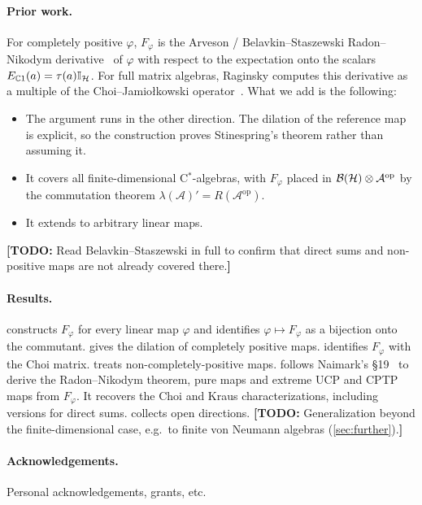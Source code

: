 \documentclass[12pt]{article}
\newcommand{\todo}[1]{\textcolor{\mysubcolor}{\small\textbf{[TODO:} #1\textbf{]}}}
\newcommand{\alg}{\mathcal{A}}             %
\newcommand{\hilb}{\mathcal{H}}            %
\newcommand{\bdd}[1]{\mathcal{B}\br{#1}}   %
\newcommand{\op}{^{\mathrm{op}}}           %
\newcommand{\Fphi}{F_{\varphi}}
\newcommand{\Esc}{E_{\complex 1}}          %
\begin{document}
\paragraph{Prior work.}
For completely positive \(\varphi\), \(\Fphi\) is the Arveson /
Belavkin--Staszewski Radon--Nikodym derivative~\cite{Arveson1969,
BelavkinStaszewski1986} of \(\varphi\) with respect to the expectation onto the scalars
\(\Esc(a) = \tau(a)\id_{\hilb}\). For full matrix algebras, Raginsky computes this
derivative as a multiple of the Choi--Jamio\l{}kowski
operator~\cite[Theorem~5.1]{Raginsky2003}. What we add is the following:
\begin{itemize}
  \item The argument runs in the other direction. The dilation of the reference
    map is explicit, so the construction proves Stinespring's theorem rather
    than assuming it.
  \item It covers all finite-dimensional C\(^*\)-algebras, with \(\Fphi\) placed in
    \(\bdd{\hilb} \tensor \alg\op\) by the commutation theorem
    \(\lambda(\alg)' = R(\alg\op)\).
  \item It extends to arbitrary linear maps.
\end{itemize}
\todo{Read Belavkin--Staszewski in full to confirm that direct sums and
non-positive maps are not already covered there.}

\paragraph{Results.}
 constructs \(\Fphi\) for every linear map \(\varphi\) and
identifies \(\varphi \mapsto \Fphi\) as a bijection onto the commutant.
 gives the dilation of completely positive maps.
 identifies \(\Fphi\) with the Choi matrix.
 treats non-completely-positive maps.
 follows Naimark's \S19~\cite{Naimark1972} to derive the
Radon--Nikodym theorem, pure maps and extreme UCP and CPTP maps from \(\Fphi\). It
recovers the Choi and Kraus characterizations, including versions for direct
sums.
 collects open directions. \todo{Generalization beyond the
finite-dimensional case, e.g.\ to finite von Neumann algebras
(\cref{sec:further}).}

\paragraph{Acknowledgements.}
Personal acknowledgements, grants, etc.
\end{document}
